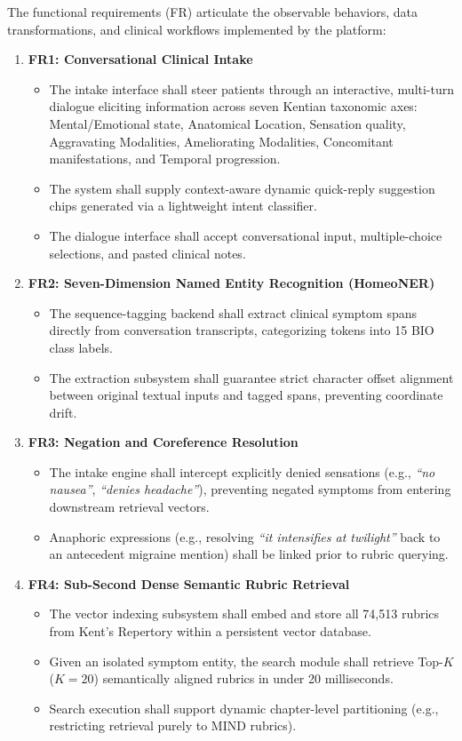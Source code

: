 The functional requirements (FR) articulate the observable behaviors, data transformations, and clinical workflows implemented by the platform:

\begin{enumerate}
  \item \textbf{FR1: Conversational Clinical Intake}
  \begin{itemize}
    \item The intake interface shall steer patients through an interactive, multi-turn dialogue eliciting information across seven Kentian taxonomic axes: Mental/Emotional state, Anatomical Location, Sensation quality, Aggravating Modalities, Ameliorating Modalities, Concomitant manifestations, and Temporal progression.
    \item The system shall supply context-aware dynamic quick-reply suggestion chips generated via a lightweight intent classifier.
    \item The dialogue interface shall accept conversational input, multiple-choice selections, and pasted clinical notes.
  \end{itemize}

  \item \textbf{FR2: Seven-Dimension Named Entity Recognition (HomeoNER)}
  \begin{itemize}
    \item The sequence-tagging backend shall extract clinical symptom spans directly from conversation transcripts, categorizing tokens into 15 BIO class labels.
    \item The extraction subsystem shall guarantee strict character offset alignment between original textual inputs and tagged spans, preventing coordinate drift.
  \end{itemize}

  \item \textbf{FR3: Negation and Coreference Resolution}
  \begin{itemize}
    \item The intake engine shall intercept explicitly denied sensations (e.g., \textit{``no nausea''}, \textit{``denies headache''}), preventing negated symptoms from entering downstream retrieval vectors.
    \item Anaphoric expressions (e.g., resolving \textit{``it intensifies at twilight''} back to an antecedent migraine mention) shall be linked prior to rubric querying.
  \end{itemize}

  \item \textbf{FR4: Sub-Second Dense Semantic Rubric Retrieval}
  \begin{itemize}
    \item The vector indexing subsystem shall embed and store all 74,513 rubrics from Kent's Repertory within a persistent vector database.
    \item Given an isolated symptom entity, the search module shall retrieve Top-$K$ ($K=20$) semantically aligned rubrics in under 20 milliseconds.
    \item Search execution shall support dynamic chapter-level partitioning (e.g., restricting retrieval purely to MIND rubrics).
  \end{itemize}


\end{enumerate}
